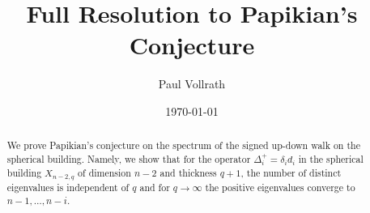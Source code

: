 \documentclass[11pt]{amsart}
\begin{document}
	\author{Paul Vollrath}
	\address{Mathematics and Computer Science\\
		Weizmann Institute of Science\\
		Rechovot 76100, Israel\\}
	\date{\today}
    \title{Full Resolution to Papikian's Conjecture}
    
    \begin{abstract}
        We prove Papikian's conjecture on the spectrum of the signed up-down walk on the spherical building. Namely, we show that for the operator $\Delta_i^+=\delta_id_i$ in the spherical building $X_{n-2,q}$ of dimension $n-2$ and thickness $q+1$, the number of distinct eigenvalues is independent of $q$ and for $q\rightarrow \infty$ the positive eigenvalues converge to $n-1,\dots, n-i$.
    \end{abstract}
    \maketitle
\end{document}
